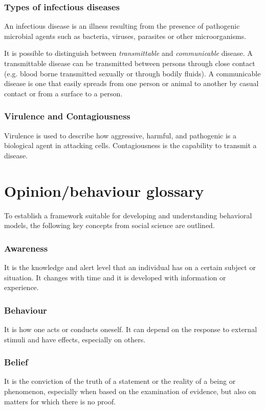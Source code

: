 \subsubsection{Types of infectious diseases}An infectious disease is an illness resulting from the presence of pathogenic microbial agents such as bacteria, viruses, parasites or other microorganisms.

It is possible to distinguish between \textit{transmittable} and \textit{communicable} disease. A transmittable disease can be transmitted between persons through close contact (e.g. blood borne transmitted sexually or through bodily fluids). A communicable disease is one that easily spreads from one person or animal to another by casual contact or from a surface to a person.  


\subsubsection{Virulence and Contagiousness}  Virulence is used to describe how aggressive, harmful, and pathogenic is a biological agent in attacking cells. Contagiousness is the capability to transmit a disease. 


\section{Opinion/behaviour glossary}
To establish a framework suitable for developing and understanding behavioral models, the following key concepts from social science are outlined.
\subsubsection{Awareness} It is the knowledge and alert level that an individual has on a certain subject or situation. It changes with time and it is developed with information or experience.  

\subsubsection{Behaviour} It is how one acts or conducts oneself. It can depend on the response to external stimuli and have effects, especially on others.


\subsubsection{Belief} It is the conviction of the truth of a statement or the reality of a being or phenomenon, especially when based on the examination of evidence, but also on matters for which there is no proof.


